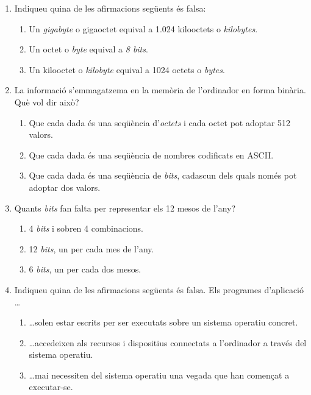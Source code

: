 \begin{enumerate}
\item Indiqueu quina de les afirmacions següents és falsa:
  \begin{enumerate}
  \item Un \emph{gigabyte} o gigaoctet equival a 1.024 kilooctets o
    \emph{kilobytes}.
  \item Un octet o \emph{byte} equival a \emph{8 bits}.
  \item Un kilooctet o \emph{kilobyte} equival a 1024 octets o
    \emph{bytes}.
  \end{enumerate}

\item La informació s'emmagatzema en la memòria de l'ordinador en
  forma binària. Què vol dir això? 
  \begin{enumerate}
  \item Que cada dada és una seqüència d'\emph{octets} i cada octet
    pot adoptar 512 valors.  
  \item Que cada dada és una seqüència de nombres codificats en
    ASCII.
  \item Que cada dada és una seqüència de \emph{bits}, cadascun dels
    quals només pot adoptar dos valors.
  \end{enumerate}

\item Quants \emph{bits} fan falta per representar els 12 mesos de
  l'any? 
  \begin{enumerate}
    \item 4 \emph{bits} i sobren 4 combinacions.
    \item 12 \emph{bits}, un per cada mes de l'any.
    \item 6 \emph{bits}, un per cada dos mesos.
    \end{enumerate}

  \item Indiqueu quina de les afirmacions següents és falsa. Els
    programes d'aplicació \ldots 
    \begin{enumerate}
    \item \ldots solen estar escrits per ser executats sobre un
      sistema operatiu concret.
    \item \ldots accedeixen als recursos i dispositius connectats a
      l'ordinador a través del sistema operatiu.
    \item \ldots mai necessiten del sistema operatiu una vegada que
      han començat a executar-se.
\end{enumerate}

\end{enumerate}

